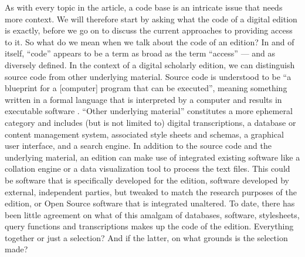 \begin{paper}
As with every topic in the article, a code base is an intricate issue
that needs more context. We will therefore start by asking what the code
of a digital edition is exactly, before we go on to discuss the current
approaches to providing access to it. So what do we mean when we talk
about the code of an edition? In and of itself, ``code'' appears to be a
term as broad as the term ``access'' --- and as diversely defined. In the
context of a digital scholarly edition, we can distinguish source code
from other underlying material. Source code is understood to be ``a
blueprint for a {[}computer{]} program that can be executed'', meaning
something written in a formal language that is interpreted by a computer
and results in executable software \citep[121]{van_zundert_code_2017}. ``Other underlying material'' constitutes a more ephemeral
category and includes (but is not limited to) digital transcriptions, a
database or content management system, associated style sheets and
schemas, a graphical user interface, and a search engine. In addition to
the source code and the underlying material, an edition can make use of
integrated existing software like a collation engine or a data
visualization tool to process the text files. This could be software
that is specifically developed for the edition, software developed by
external, independent parties, but tweaked to match the research
purposes of the edition, or Open Source software that is integrated
unaltered. To date, there has been little agreement on what of this
amalgam of databases, software, stylesheets, query functions and
transcriptions makes up the code of the edition. Everything together or
just a selection? And if the latter, on what grounds is the selection
made?


\end{paper}
